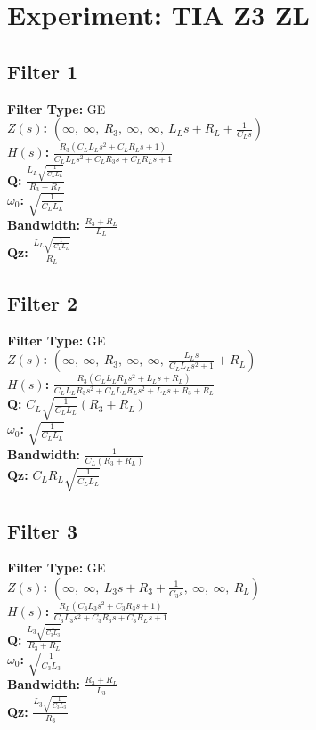 \documentclass{article}
\begin{document}
        \section*{Experiment: TIA Z3 ZL}
\subsection*{Filter 1}
\textbf{Filter Type:} GE \\ 
\textbf{$Z(s)$:} $\left( \infty, \  \infty, \  R_{3}, \  \infty, \  \infty, \  L_{L} s + R_{L} + \frac{1}{C_{L} s}\right)$ \\ 
\textbf{$H(s)$:} $\frac{R_{3} \left(C_{L} L_{L} s^{2} + C_{L} R_{L} s + 1\right)}{C_{L} L_{L} s^{2} + C_{L} R_{3} s + C_{L} R_{L} s + 1}$ \\ 
\textbf{Q:} $\frac{L_{L} \sqrt{\frac{1}{C_{L} L_{L}}}}{R_{3} + R_{L}}$ \\ 
\textbf{$\omega_0$:} $\sqrt{\frac{1}{C_{L} L_{L}}}$ \\ 
\textbf{Bandwidth:} $\frac{R_{3} + R_{L}}{L_{L}}$ \\ 
\textbf{Qz:} $\frac{L_{L} \sqrt{\frac{1}{C_{L} L_{L}}}}{R_{L}}$ \\ 
\subsection*{Filter 2}
\textbf{Filter Type:} GE \\ 
\textbf{$Z(s)$:} $\left( \infty, \  \infty, \  R_{3}, \  \infty, \  \infty, \  \frac{L_{L} s}{C_{L} L_{L} s^{2} + 1} + R_{L}\right)$ \\ 
\textbf{$H(s)$:} $\frac{R_{3} \left(C_{L} L_{L} R_{L} s^{2} + L_{L} s + R_{L}\right)}{C_{L} L_{L} R_{3} s^{2} + C_{L} L_{L} R_{L} s^{2} + L_{L} s + R_{3} + R_{L}}$ \\ 
\textbf{Q:} $C_{L} \sqrt{\frac{1}{C_{L} L_{L}}} \left(R_{3} + R_{L}\right)$ \\ 
\textbf{$\omega_0$:} $\sqrt{\frac{1}{C_{L} L_{L}}}$ \\ 
\textbf{Bandwidth:} $\frac{1}{C_{L} \left(R_{3} + R_{L}\right)}$ \\ 
\textbf{Qz:} $C_{L} R_{L} \sqrt{\frac{1}{C_{L} L_{L}}}$ \\ 
\subsection*{Filter 3}
\textbf{Filter Type:} GE \\ 
\textbf{$Z(s)$:} $\left( \infty, \  \infty, \  L_{3} s + R_{3} + \frac{1}{C_{3} s}, \  \infty, \  \infty, \  R_{L}\right)$ \\ 
\textbf{$H(s)$:} $\frac{R_{L} \left(C_{3} L_{3} s^{2} + C_{3} R_{3} s + 1\right)}{C_{3} L_{3} s^{2} + C_{3} R_{3} s + C_{3} R_{L} s + 1}$ \\ 
\textbf{Q:} $\frac{L_{3} \sqrt{\frac{1}{C_{3} L_{3}}}}{R_{3} + R_{L}}$ \\ 
\textbf{$\omega_0$:} $\sqrt{\frac{1}{C_{3} L_{3}}}$ \\ 
\textbf{Bandwidth:} $\frac{R_{3} + R_{L}}{L_{3}}$ \\ 
\textbf{Qz:} $\frac{L_{3} \sqrt{\frac{1}{C_{3} L_{3}}}}{R_{3}}$ \\ 
\end{document}
